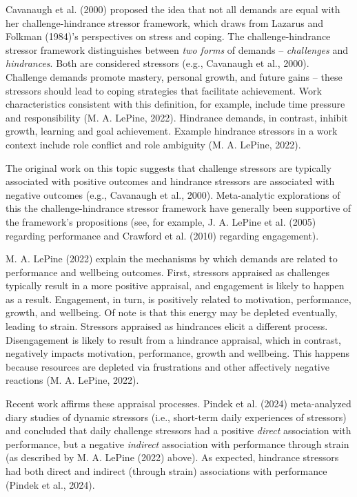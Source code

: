\documentclass[
  man,mask]{apa7}
\begin{document}
Cavanaugh et al. (2000) proposed the idea that not all demands are equal with her challenge-hindrance stressor framework, which draws from Lazarus and Folkman (1984)'s perspectives on stress and coping. The challenge-hindrance stressor framework distinguishes between \emph{two forms} of demands -- \emph{challenges} and \emph{hindrances}. Both are considered stressors (e.g., Cavanaugh et al., 2000). Challenge demands promote mastery, personal growth, and future gains -- these stressors should lead to coping strategies that facilitate achievement. Work characteristics consistent with this definition, for example, include time pressure and responsibility (M. A. LePine, 2022). Hindrance demands, in contrast, inhibit growth, learning and goal achievement. Example hindrance stressors in a work context include role conflict and role ambiguity (M. A. LePine, 2022).

The original work on this topic suggests that challenge stressors are typically associated with positive outcomes and hindrance stressors are associated with negative outcomes (e.g., Cavanaugh et al., 2000). Meta-analytic explorations of this the challenge-hindrance stressor framework have generally been supportive of the framework's propositions (see, for example, J. A. LePine et al. (2005) regarding performance and Crawford et al. (2010) regarding engagement).

M. A. LePine (2022) explain the mechanisms by which demands are related to performance and wellbeing outcomes. First, stressors appraised as challenges typically result in a more positive appraisal, and engagement is likely to happen as a result. Engagement, in turn, is positively related to motivation, performance, growth, and wellbeing. Of note is that this energy may be depleted eventually, leading to strain. Stressors appraised as hindrances elicit a different process. Disengagement is likely to result from a hindrance appraisal, which in contrast, negatively impacts motivation, performance, growth and wellbeing. This happens because resources are depleted via frustrations and other affectively negative reactions (M. A. LePine, 2022).

Recent work affirms these appraisal processes. Pindek et al. (2024) meta-analyzed diary studies of dynamic stressors (i.e., short-term daily experiences of stressors) and concluded that daily challenge stressors had a positive \emph{direct} association with performance, but a negative \emph{indirect} association with performance through strain (as described by M. A. LePine (2022) above). As expected, hindrance stressors had both direct and indirect (through strain) associations with performance (Pindek et al., 2024).
\end{document}
